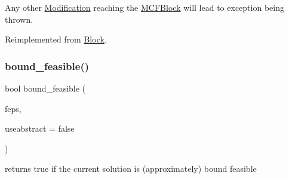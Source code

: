 Any other \mbox{\hyperlink{class_s_m_spp__di__unipi__it_1_1_modification}{Modification}} reaching the \mbox{\hyperlink{class_s_m_spp__di__unipi__it_1_1_m_c_f_block}{M\+C\+F\+Block}} will lead to exception being thrown. 

Reimplemented from \mbox{\hyperlink{class_s_m_spp__di__unipi__it_1_1_block_a9b94536a10555dfb680e015fcb4787a8}{Block}}.

\mbox{\label{class_s_m_spp__di__unipi__it_1_1_m_c_f_block_abd1c590cbb101caa2478b453777f3dc4}} 
\subsubsection{\texorpdfstring{bound\+\_\+feasible()}{bound\_feasible()}}
{\footnotesize\ttfamily bool bound\+\_\+feasible (\begin{DoxyParamCaption}\item[{\mbox{\hyperlink{class_s_m_spp__di__unipi__it_1_1_m_c_f_block_a956c123a5a6b2b52f033ca1987acd80e}{c\+\_\+\+F\+Number}}}]{feps,  }\item[{bool}]{useabstract = {\ttfamily false} }\end{DoxyParamCaption})}



returns true if the current solution is (approximately) bound feasible 

